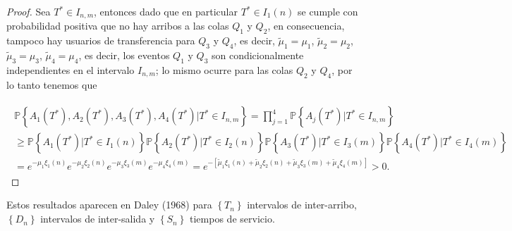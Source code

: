 \documentclass{article}
\newcommand{\prob}{\mathbb{P}}
\numberwithin{equation}{section}
\begin{document}
\begin{proof}
Sea $T^{*}\in I_{n,m}$, entonces dado que en particular $T^{*}\in I_{1}\left(n\right)$ se cumple con probabilidad positiva que no hay arribos a las colas $Q_{1}$ y $Q_{2}$, en consecuencia, tampoco hay usuarios de transferencia para $Q_{3}$ y $Q_{4}$, es decir, $\tilde{\mu}_{1}=\mu_{1}$, $\tilde{\mu}_{2}=\mu_{2}$, $\tilde{\mu}_{3}=\mu_{3}$, $\tilde{\mu}_{4}=\mu_{4}$, es decir, los eventos $Q_{1}$ y $Q_{3}$ son condicionalmente independientes en el intervalo $I_{n,m}$; lo mismo ocurre para las colas $Q_{2}$ y $Q_{4}$, por lo tanto tenemos que


\begin{eqnarray}
\begin{array}{l}
\prob\left\{A_{1}\left(T^{*}\right),A_{2}\left(T^{*}\right),
A_{3}\left(T^{*}\right),A_{4}\left(T^{*}\right)|T^{*}\in I_{n,m}\right\}
=\prod_{j=1}^{4}\prob\left\{A_{j}\left(T^{*}\right)|T^{*}\in I_{n,m}\right\}\\
\geq\prob\left\{A_{1}\left(T^{*}\right)|T^{*}\in I_{1}\left(n\right)\right\}
\prob\left\{A_{2}\left(T^{*}\right)|T^{*}\in I_{2}\left(n\right)\right\}
\prob\left\{A_{3}\left(T^{*}\right)|T^{*}\in I_{3}\left(m\right)\right\}
\prob\left\{A_{4}\left(T^{*}\right)|T^{*}\in I_{4}\left(m\right)\right\}\\
=e^{-\mu_{1}\xi_{1}\left(n\right)}
e^{-\mu_{2}\xi_{2}\left(n\right)}
e^{-\mu_{3}\xi_{3}\left(m\right)}
e^{-\mu_{4}\xi_{4}\left(m\right)}
=e^{-\left[\tilde{\mu}_{1}\xi_{1}\left(n\right)
+\tilde{\mu}_{2}\xi_{2}\left(n\right)
+\tilde{\mu}_{3}\xi_{3}\left(m\right)
+\tilde{\mu}_{4}\xi_{4}
\left(m\right)\right]}>0.
\end{array}
\end{eqnarray}
\end{proof}


Estos resultados aparecen en Daley (1968) \cite{Daley68} para $\left\{T_{n}\right\}$ intervalos de inter-arribo, $\left\{D_{n}\right\}$ intervalos de inter-salida y $\left\{S_{n}\right\}$ tiempos de servicio.
\end{document}

